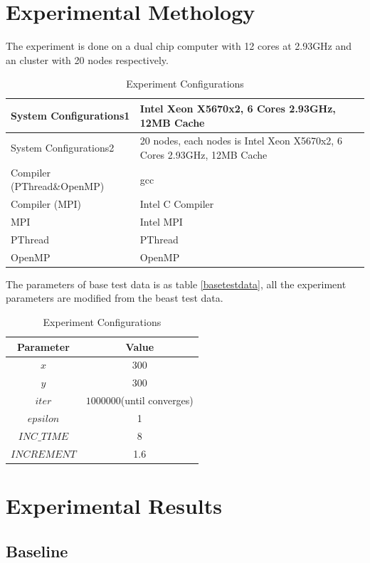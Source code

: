\documentclass{acm_proc_article-sp}
\begin{document}
\section{Experimental Methology}
The experiment is done on a dual chip computer with 12 cores at 2.93GHz and an cluster with 20 nodes respectively. 
\begin{table}[htbp]
  \centering\caption{\label{MPI}Experiment Configurations}
  \begin{tabular}{|p{3cm}|p{4cm}|}
  \hline
  System Configurations1 & Intel Xeon X5670x2, 6 Cores \@ 2.93GHz, 12MB Cache\\
  \hline
  System Configurations2 & 20 nodes, each nodes is Intel Xeon X5670x2, 6 Cores \@ 2.93GHz, 12MB Cache\\
  \hline
  Compiler (PThread\&OpenMP) & gcc \\
  \hline
  Compiler (MPI) & Intel C Compiler\\
  \hline
  MPI & Intel MPI\\
  \hline
  PThread & PThread \\
  \hline
  OpenMP & OpenMP\\
  \hline
  \end{tabular}
\end{table}

The parameters of base test data is as table \ref{basetestdata}, all the experiment parameters are modified from the beast test data.
\begin{table}[htbp]
  \centering\caption{\label{MPI}Experiment Configurations}
  \begin{tabular}{|c|c|}
  \hline
  Parameter & Value \\
  \hline
  $x$	& 300 \\
  \hline
  $y$   & 300 \\
  \hline
  $iter$ & $1000000$(until converges) \\
  \hline
  $epsilon$ & 1 \\
  \hline
  $INC\_TIME$ & 8\\
  \hline
  $INCREMENT$ & 1.6\\
  \hline
  \end{tabular}
\end{table}

\section{Experimental Results}

\subsection{Baseline}
\end{document}
